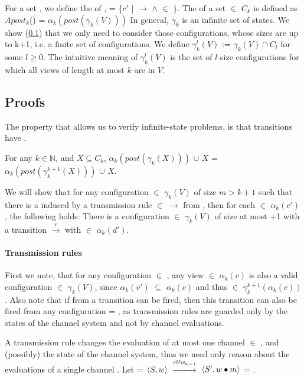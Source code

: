 For a set , we define the  of ,  = \{$c'$ |  $\rightarrow$  $\wedge$  $\in$ \}. The  of a set  $\in$ $C_k$ is defined as $Apost_k$() = $\alpha_k(post(\gamma_k(V)))$ In general, $\gamma_k$ is an infinite set of states. We show (\ref{proof}) that we only need to consider those configurations, whose sizes are up to k+1, i.e. a finite set of configurations. We define $\gamma_k^l(V)$ := $\gamma_k(V) \cap C_l$ for some $l\geq 0$. The intuitive meaning of $\gamma_k^l(V)$ is the set of $l$-size configurations for which all views of length at most $k$ are in $V$.

\subsection{Proofs}
\label{proof}
The property that allows us to verify infinite-state problems, is that transitions have .

\begin{lemma}
\label{lemma1}
For any $k\in\mathbb{N}$, and $X\subseteq C_k$, $\alpha_k(post(\gamma_k(X)))$ $\cup$ $X$ = $\alpha_k(post(\gamma_k^{k+1}(X)))$ $\cup$ $X$.
\end{lemma}

We will show that for any configuration  $\in$ $\gamma_k(V)$ of size $m > k + 1$ such that there is a  induced by a transmission rule  $\in$ $\rightarrow$ from , then for each  $\in$ $\alpha_k(c')$, the following holds: There is a configuration  $\in$ $\gamma_k(V)$ of size at most +1 with a transition  $\xrightarrow{r}$  with  $\in$ $\alpha_k(d')$. 

\paragraph{Transmission rules}
\label{proofTransmission}
First we note, that for any configuration  $\in$ , any view  $\in$ $\alpha_k(c)$ is also a valid configuration  $\in$ $\gamma_k(V)$, since $\alpha_k(v')$ $\subseteq$ $\alpha_k(c)$ and thus  $\in$ $\gamma_k^{k+1}(\alpha_k(c))$. Also note that if from  a transition  can be fired, then this transition can also be fired from any configuration  = , as transmission rules are guarded only by the states of the channel system and not by channel evaluations.

A transmission rule changes the evaluation of at most one channel  $\in$ , and (possibly) the state of the channel system, thus we need only reason about the evaluations of a single channel .
Let  = $\langle S, w\rangle$ $\xrightarrow{ch!w_{m+1}}$ $\langle S', w \bullet m\rangle$ = .


